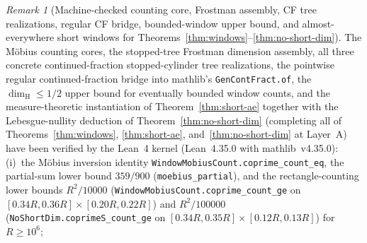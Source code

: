 \documentclass[11pt]{article}
\theoremstyle{definition}
\theoremstyle{remark}
\newtheorem{remark}[theorem]{Remark}
\newcommand{\dimH}{\dim_{\mathrm{H}}}
\begin{document}
\begin{remark}[Machine-checked counting core, Frostman assembly, CF tree realizations, regular CF bridge, bounded-window upper bound, and almost-everywhere short windows for Theorems~\ref{thm:windows}--\ref{thm:no-short-dim}]\label{rem:windows-lean}
The M\"obius counting cores, the stopped-tree Frostman dimension assembly, all three concrete continued-fraction stopped-cylinder tree realizations, the pointwise regular continued-fraction bridge into mathlib's \texttt{GenContFract.of}, the $\dimH\le1/2$ upper bound for eventually bounded window counts, and the measure-theoretic instantiation of Theorem~\ref{thm:short-ae} together with the Lebesgue-nullity deduction of Theorem~\ref{thm:no-short-dim} (completing all of Theorems~\ref{thm:windows}, \ref{thm:short-ae}, and~\ref{thm:no-short-dim} at Layer~A) have been verified by the Lean~4 kernel (Lean~4.35.0 with mathlib~v4.35.0):
(i)~the M\"obius inversion identity \texttt{WindowMobiusCount.\allowbreak coprime\_\allowbreak count\_\allowbreak eq}, the partial-sum lower bound $359/900$ (\texttt{moebius\_\allowbreak partial}), and the rectangle-counting lower bounds $R^2/10000$ (\texttt{WindowMobiusCount.\allowbreak coprime\_\allowbreak count\_\allowbreak ge} on $[0.34R,0.36R]\times[0.20R,0.22R]$) and $R^2/100000$ (\texttt{NoShortDim.\allowbreak coprimeS\_\allowbreak count\_\allowbreak ge} on $[0.34R,0.35R]\times[0.12R,0.13R]$) for $R\ge10^6$;

\end{remark}
\end{document}
